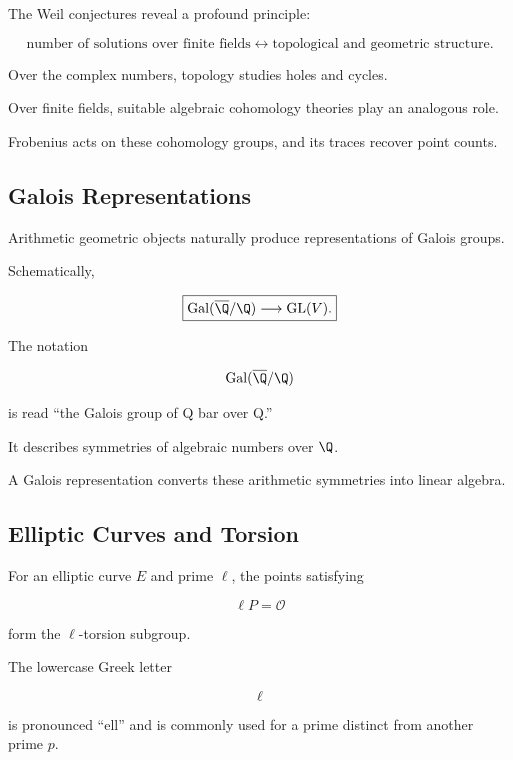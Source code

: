 The Weil conjectures reveal a profound principle:

\[
\boxed{
\text{number of solutions over finite fields}
\longleftrightarrow
\text{topological and geometric structure}.
}
\]

Over the complex numbers, topology studies holes and cycles.

Over finite fields, suitable algebraic cohomology theories play an analogous
role.

Frobenius acts on these cohomology groups, and its traces recover point
counts.

\subsection{Galois Representations}
\label{subsec:galois-representations-arithmetic-geometry}

Arithmetic geometric objects naturally produce representations of Galois
groups.

Schematically,

\[ \boxed{
\operatorname{Gal}(\overline{\Q}/\Q)
\longrightarrow
\operatorname{GL}(V).
} \]

The notation

\[ \operatorname{Gal}(\overline{\Q}/\Q) \]

is read ``the Galois group of Q bar over Q.''

It describes symmetries of algebraic numbers over \(\Q\).

A Galois representation converts these arithmetic symmetries into linear
algebra.

\subsection{Elliptic Curves and Torsion}
\label{subsec:elliptic-torsion-galois}

For an elliptic curve \(E\) and prime \(\ell\), the points satisfying

\[ \ell P=\mathcal O \]

form the \(\ell\)-torsion subgroup.

The lowercase Greek letter

\[ \ell \]

is pronounced ``ell'' and is commonly used for a prime distinct from another
prime \(p\).

